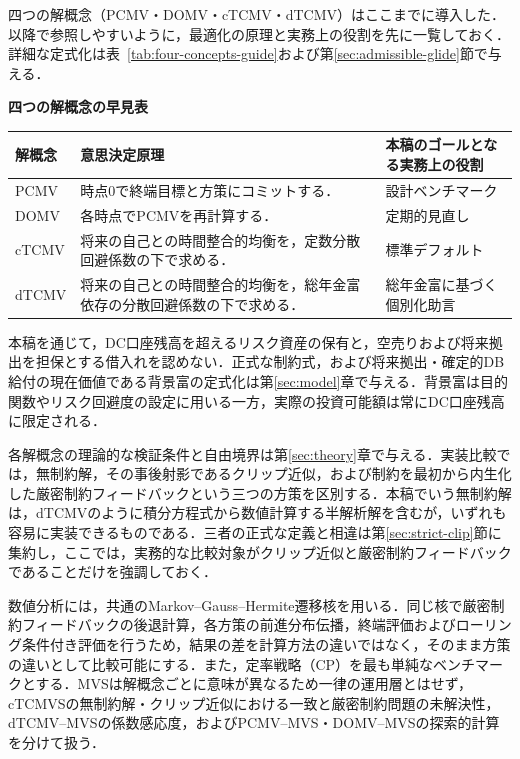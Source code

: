 \documentclass[10pt,a4paper]{article}
\theoremstyle{plain}
\theoremstyle{definition}
\begin{document}
四つの解概念（PCMV・DOMV・cTCMV・dTCMV）はここまでに導入した．以降で参照しやすいように，最適化の原理と実務上の役割を先に一覧しておく．詳細な定式化は表~\ref{tab:four-concepts-guide}および第\ref{sec:admissible-glide}節で与える．

\begin{center}
\small
\textbf{四つの解概念の早見表}\par\smallskip
{\renewcommand{\arraystretch}{1.08}%
\begin{tabularx}{\textwidth}{p{17mm}p{88mm}X}
\toprule
解概念 & 意思決定原理 & 本稿のゴールとなる実務上の役割 \\
\midrule
PCMV & 時点0で終端目標と方策にコミットする． & 設計ベンチマーク \\
DOMV & 各時点でPCMVを再計算する． & 定期的見直し \\
cTCMV & 将来の自己との時間整合的均衡を，定数分散回避係数の下で求める． & 標準デフォルト \\
dTCMV & 将来の自己との時間整合的均衡を，総年金富依存の分散回避係数の下で求める． & 総年金富に基づく個別化助言 \\
\bottomrule
\end{tabularx}}
\end{center}

本稿を通じて，DC口座残高を超えるリスク資産の保有と，空売りおよび将来拠出を担保とする借入れを認めない．正式な制約式，および将来拠出・確定的DB給付の現在価値である背景富の定式化は第\ref{sec:model}章で与える．背景富は目的関数やリスク回避度の設定に用いる一方，実際の投資可能額は常にDC口座残高に限定される．

各解概念の理論的な検証条件と自由境界は第\ref{sec:theory}章で与える．実装比較では，無制約解，その事後射影であるクリップ近似，および制約を最初から内生化した厳密制約フィードバックという三つの方策を区別する．本稿でいう無制約解は，dTCMVのように積分方程式から数値計算する半解析解を含むが，いずれも容易に実装できるものである．三者の正式な定義と相違は第\ref{sec:strict-clip}節に集約し，ここでは，実務的な比較対象がクリップ近似と厳密制約フィードバックであることだけを強調しておく．

数値分析には，共通のMarkov--Gauss--Hermite遷移核を用いる．同じ核で厳密制約フィードバックの後退計算，各方策の前進分布伝播，終端評価およびローリング条件付き評価を行うため，結果の差を計算方法の違いではなく，そのまま方策の違いとして比較可能にする．また，定率戦略（CP）を最も単純なベンチマークとする．MVSは解概念ごとに意味が異なるため一律の運用層とはせず，cTCMVSの無制約解・クリップ近似における一致と厳密制約問題の未解決性，dTCMV--MVSの係数感応度，およびPCMV--MVS・DOMV--MVSの探索的計算を分けて扱う．
\end{document}
